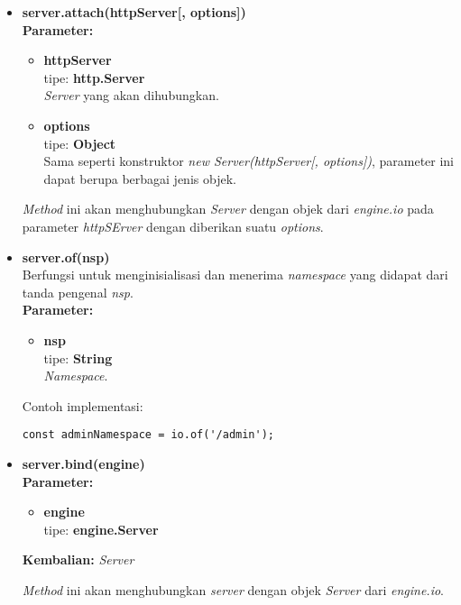 \begin{enumerate}
\begin{itemize}
			\item \textbf{server.attach(httpServer[, options])} \\
			\textbf{Parameter:} 
			\begin{itemize}
				\item \textbf{httpServer} \\tipe: \textbf{http.Server} \\ \textit{Server} yang akan dihubungkan.
				\item \textbf{options} \\tipe: \textbf{Object} \\ Sama seperti konstruktor \textit{new Server(httpServer[, options])}, parameter ini dapat berupa berbagai jenis objek.
			\end{itemize}
			\textit{Method} ini akan menghubungkan \textit{Server} dengan objek dari \textit{engine.io} pada parameter \textit{httpSErver} dengan diberikan suatu \textit{options}.
			
			\item \textbf{server.of(nsp)} \\
			Berfungsi untuk menginisialisasi dan menerima \textit{namespace} yang didapat dari tanda pengenal \textit{nsp}. \\
			\textbf{Parameter:}
			\begin{itemize}
				\item \textbf{nsp} \\tipe: \textbf{String} \\ \textit{Namespace}.
			\end{itemize}
			Contoh implementasi:
\begin{lstlisting}
const adminNamespace = io.of('/admin');
\end{lstlisting}
			
			\item \textbf{server.bind(engine)} \\
			\textbf{Parameter:}
			\begin{itemize}
				\item \textbf{engine} \\tipe: \textbf{engine.Server}
			\end{itemize}
			\textbf{Kembalian:} \textit{Server}
			
			\textit{Method} ini akan menghubungkan \textit{server} dengan objek \textit{Server} dari \textit{engine.io}.
			

\end{itemize}
\end{enumerate}
